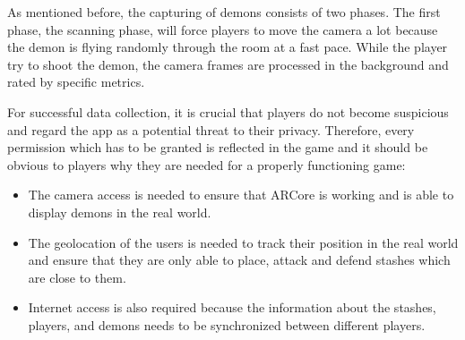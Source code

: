 As mentioned before, the capturing of demons consists of two phases.
The first phase, the scanning phase, will force players to move the camera a lot because the demon is flying randomly through the room at a fast pace.
While the player try to shoot the demon, the camera frames are processed in the background and rated by specific metrics.


For successful data collection, it is crucial that players do not become suspicious and regard the app as a potential threat to their privacy.
Therefore, every permission which has to be granted is reflected in the game and it should be obvious to players why they are needed for a properly functioning game:
\begin{itemize}
    \item The camera access is needed to ensure that ARCore is working and is able to display demons in the real world.
    \item The geolocation of the users is needed to track their position in the real world and ensure that they are only able to place, attack and defend stashes which are close to them.
    \item Internet access is also required because the information about the stashes, players, and demons needs to be synchronized between different players.
\end{itemize}

 

